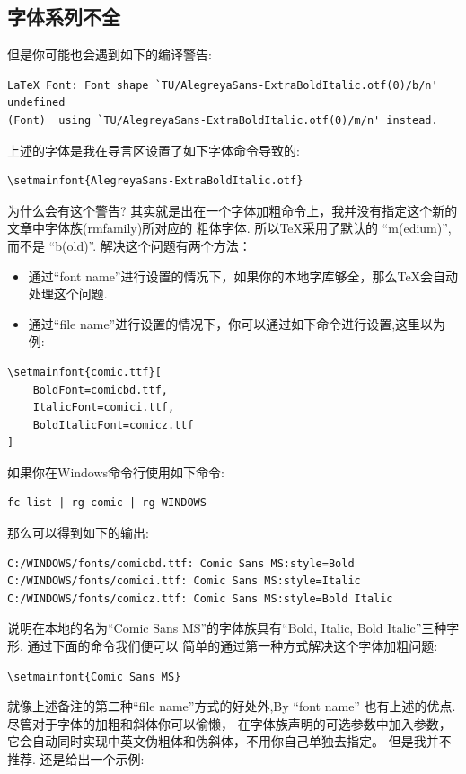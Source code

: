 \subsection{字体系列不全}
但是你可能也会遇到如下的编译警告:
\begin{verbatim}
LaTeX Font: Font shape `TU/AlegreyaSans-ExtraBoldItalic.otf(0)/b/n' undefined
(Font)	using `TU/AlegreyaSans-ExtraBoldItalic.otf(0)/m/n' instead.
\end{verbatim}

上述的字体是我在导言区设置了如下字体命令导致的:
\begin{verbatim}
\setmainfont{AlegreyaSans-ExtraBoldItalic.otf}
\end{verbatim}

为什么会有这个警告? 其实就是出在一个字体加粗命令\cmd{\textbf}上，我并没有指定这个新的文章中字体族(rmfamily)所对应的
粗体字体. 所以\TeX{}采用了默认的 ``m(edium)'', 而不是 ``b(old)''. 解决这个问题有两个方法：
\begin{itemize}
    \item 通过``font name''进行设置的情况下，如果你的本地字库够全，那么\TeX{}会自动处理这个问题.
    \item 通过``file name''进行设置的情况下，你可以通过如下命令进行设置,这里以为例:
\end{itemize}

\begin{verbatim}
\setmainfont{comic.ttf}[
    BoldFont=comicbd.ttf,
    ItalicFont=comici.ttf,
    BoldItalicFont=comicz.ttf
]
\end{verbatim}

如果你在Windows命令行使用如下命令:
\begin{verbatim}
fc-list | rg comic | rg WINDOWS
\end{verbatim}

那么可以得到如下的输出:
\begin{verbatim}
C:/WINDOWS/fonts/comicbd.ttf: Comic Sans MS:style=Bold
C:/WINDOWS/fonts/comici.ttf: Comic Sans MS:style=Italic
C:/WINDOWS/fonts/comicz.ttf: Comic Sans MS:style=Bold Italic
\end{verbatim}

说明在本地的名为``Comic Sans MS''的字体族具有``Bold, Italic, Bold Italic''三种字形. 通过下面的命令我们便可以
简单的通过第一种方式解决这个字体加粗问题:
\begin{verbatim}
\setmainfont{Comic Sans MS}
\end{verbatim}

\begin{leftbar}%
就像上述备注的第二种``file name''方式的好处外,By ``font name'' 也有上述的优点. 尽管对于字体的加粗和斜体你可以偷懒，
在字体族声明的可选参数中加入参数，它会自动同时实现中英文伪粗体和伪斜体，不用你自己单独去指定。
但是我并不推荐. 还是给出一个示例:
\end{leftbar}

